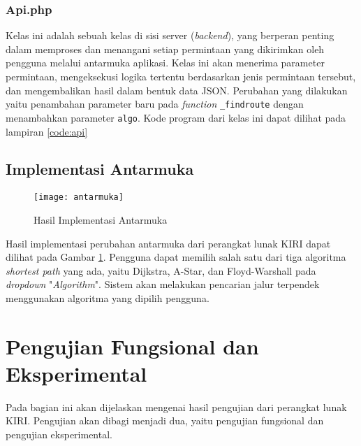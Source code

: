 \subsubsection{Api.php}
Kelas ini adalah sebuah kelas di sisi server (\textit{backend}), yang berperan penting dalam memproses dan menangani setiap permintaan yang dikirimkan oleh pengguna melalui antarmuka aplikasi. Kelas ini akan menerima parameter permintaan, mengeksekusi logika tertentu berdasarkan jenis permintaan tersebut, dan mengembalikan hasil dalam bentuk data JSON. Perubahan yang dilakukan yaitu penambahan parameter baru pada \textit{function} \texttt{\_findroute} dengan menambahkan parameter \texttt{algo}. Kode program dari kelas ini dapat dilihat pada lampiran \ref{code:api}

\subsection{Implementasi Antarmuka}
\label{subsec:penjelasankode}
\begin{figure}[H]
    \centering
    \texttt{[image: antarmuka]}
    \caption{Hasil Implementasi Antarmuka}
    \label{fig:antarmuka}
\end{figure}

\noindent
Hasil implementasi perubahan antarmuka dari perangkat lunak KIRI dapat dilihat pada Gambar \ref{fig:antarmuka}. Pengguna dapat memilih salah satu dari tiga algoritma \textit{shortest path} yang ada, yaitu Dijkstra, A-Star, dan Floyd-Warshall pada \textit{dropdown} "\textit{Algorithm}". Sistem akan melakukan pencarian jalur terpendek menggunakan algoritma yang dipilih pengguna.

\section{Pengujian Fungsional dan Eksperimental}
\label{sec:pengujian}
Pada bagian ini akan dijelaskan mengenai hasil pengujian dari perangkat lunak KIRI. Pengujian akan dibagi menjadi dua, yaitu pengujian fungsional dan pengujian eksperimental.

